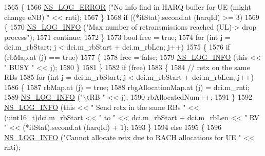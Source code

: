 \begin{DoxyCode}
1565                 \{
1566                   \hyperlink{group__logging_ga0261a8db1d4ac5f79417d117634fd455}{NS\_LOG\_ERROR} (\textcolor{stringliteral}{"No info find in HARQ buffer for UE (might change eNB) "} << 
      rnti);
1567                 \}
1568               \textcolor{keywordflow}{if} ((*itStat).second.at (harqId) >= 3)
1569                 \{
1570                   \hyperlink{group__logging_gafbd73ee2cf9f26b319f49086d8e860fb}{NS\_LOG\_INFO} (\textcolor{stringliteral}{"Max number of retransmissions reached (UL)-> drop process"});
1571                   \textcolor{keywordflow}{continue};
1572                 \}
1573               \textcolor{keywordtype}{bool} free = \textcolor{keyword}{true};
1574               \textcolor{keywordflow}{for} (\textcolor{keywordtype}{int} j = dci.m\_rbStart; j < dci.m\_rbStart + dci.m\_rbLen; j++)
1575                 \{
1576                   \textcolor{keywordflow}{if} (rbMap.at (j) == \textcolor{keyword}{true})
1577                     \{
1578                       free = \textcolor{keyword}{false};
1579                       \hyperlink{group__logging_gafbd73ee2cf9f26b319f49086d8e860fb}{NS\_LOG\_INFO} (\textcolor{keyword}{this} << \textcolor{stringliteral}{" BUSY "} << j);
1580                     \}
1581                 \}
1582               \textcolor{keywordflow}{if} (free)
1583                 \{
1584                   \textcolor{comment}{// retx on the same RBs}
1585                   \textcolor{keywordflow}{for} (\textcolor{keywordtype}{int} j = dci.m\_rbStart; j < dci.m\_rbStart + dci.m\_rbLen; j++)
1586                     \{
1587                       rbMap.at (j) = \textcolor{keyword}{true};
1588                       rbgAllocationMap.at (j) = dci.m\_rnti;
1589                       \hyperlink{group__logging_gafbd73ee2cf9f26b319f49086d8e860fb}{NS\_LOG\_INFO} (\textcolor{stringliteral}{"\(\backslash\)tRB "} << j);
1590                       rbAllocatedNum++;
1591                     \}
1592                   \hyperlink{group__logging_gafbd73ee2cf9f26b319f49086d8e860fb}{NS\_LOG\_INFO} (\textcolor{keyword}{this} << \textcolor{stringliteral}{" Send retx in the same RBs "} << (uint16\_t)dci.m\_rbStart 
      << \textcolor{stringliteral}{" to "} << dci.m\_rbStart + dci.m\_rbLen << \textcolor{stringliteral}{" RV "} << (*itStat).second.at (harqId) + 1);
1593                 \}
1594               \textcolor{keywordflow}{else}
1595                 \{
1596                   \hyperlink{group__logging_gafbd73ee2cf9f26b319f49086d8e860fb}{NS\_LOG\_INFO} (\textcolor{stringliteral}{"Cannot allocate retx due to RACH allocations for UE "} << rnti);

\end{DoxyCode}

